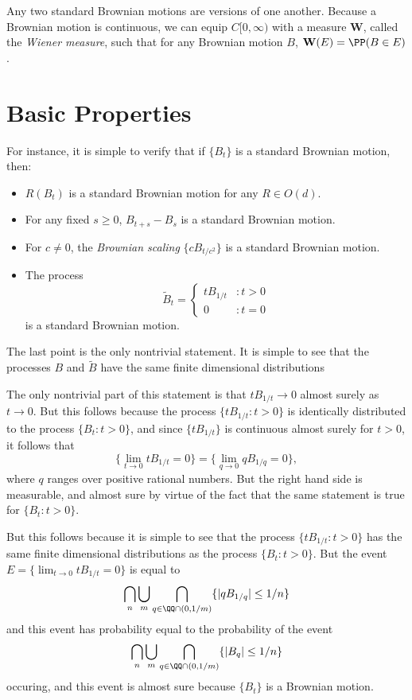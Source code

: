 Any two standard Brownian motions are versions of one another. Because a Brownian motion is continuous, we can equip $C[0,\infty)$ with a measure $\mathbf{W}$, called the \emph{Wiener measure}, such that for any Brownian motion $B$, $\mathbf{W}(E) = \PP(B \in E)$.

\section{Basic Properties}

For instance, it is simple to verify that if $\{ B_t \}$ is a standard Brownian motion, then:
%
\begin{itemize}
    \item $R(B_t)$ is a standard Brownian motion for any $R \in O(d)$.
    \item For any fixed $s \geq 0$, $B_{t + s} - B_s$ is a standard Brownian motion.
    \item For $c \neq 0$, the \emph{Brownian scaling} $\{ c B_{t/c^2} \}$ is a standard Brownian motion.
    \item The process
    \[ \tilde{B}_t = \begin{cases} t B_{1/t} &: t > 0 \\ 0 &: t = 0 \end{cases} \]
    is a standard Brownian motion.
\end{itemize}
%
The last point is the only nontrivial statement. It is simple to see that the processes $B$ and $\tilde{B}$ have the same finite dimensional distributions


The only nontrivial part of this statement is that $t B_{1/t} \to 0$ almost surely as $t \to 0$. But this follows because the process $\{ t B_{1/t} : t > 0 \}$ is identically distributed to the process $\{ B_t : t > 0 \}$, and since $\{ t B_{1/t} \}$ is continuous almost surely for $t > 0$, it follows that
%
\[ \{ \lim_{t \to 0} t B_{1/t} = 0 \} = \{ \lim_{q \to 0} q B_{1/q} = 0 \}, \]
%
where $q$ ranges over positive rational numbers. But the right hand side is measurable, and almost sure by virtue of the fact that the same statement is true for $\{ B_t : t > 0 \}$.

But this follows because it is simple to see that the process $\{ t B_{1/t} : t > 0 \}$ has the same finite dimensional distributions as the process $\{ B_t : t > 0 \}$. But the event $E = \{ \lim_{t \to 0} t B_{1/t} = 0 \}$ is equal to
%
\[ \bigcap_n \bigcup_m \bigcap_{q \in \QQ \cap (0,1/m)} \{ |q B_{1/q}| \leq 1/n \} \]
%
and this event has probability equal to the probability of the event
%
\[ \bigcap_n \bigcup_m \bigcap_{q \in \QQ \cap (0,1/m)} \{ |B_q| \leq 1/n \} \]
%
occuring, and this event is almost sure because $\{ B_t \}$ is a Brownian motion.

